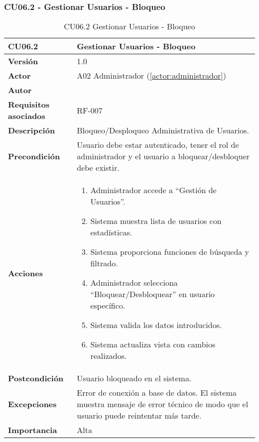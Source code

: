 \subsubsection{CU06.2 - Gestionar Usuarios - Bloqueo}

\begin{table}[H]
	\centering
	\begin{tabularx}{\linewidth}{ p{} p{} }
		\toprule
		\textbf{CU06.2}    & \textbf{Gestionar Usuarios - Bloqueo} \\
		\toprule
		\textbf{Versión}              & 1.0    \\
		\textbf{Actor}                & A02 Administrador (\ref{actor:administrador}) \\
		\textbf{Autor}                & \nombre \\
		\textbf{Requisitos asociados} & RF-007 \\
		\textbf{Descripción}          & Bloqueo/Desploqueo Administrativa de Usuarios. \\
		\textbf{Precondición}         & Usuario debe estar autenticado, tener el rol de administrador y el usuario a bloquear/desbloquer debe existir. \\
		\textbf{Acciones}             &
		\begin{enumerate}
			\def\labelenumi{\arabic{enumi}.}
			\tightlist
			\item Administrador accede a ``Gestión de Usuarios''.
            \item Sistema muestra lista de usuarios con estadísticas.
            \item Sistema proporciona funciones de búsqueda y filtrado.
            \item Administrador selecciona ``Bloquear/Desbloquear'' en usuario específico.
            \item Sistema valida los datos introducidos.
            \item Sistema actualiza vista con cambios realizados.
		\end{enumerate}\\
		\textbf{Postcondición}        & Usuario bloqueado en el sistema.\\
		\textbf{Excepciones}          & Error de conexión a base de datos. El sistema muestra mensaje de error técnico de modo que el usuario puede reintentar más tarde.\\
		\textbf{Importancia}          & Alta \\
		\bottomrule
	\end{tabularx}
	\caption{CU06.2 Gestionar Usuarios - Bloqueo}
	\label{cu:gestionar-usuarios-bloqueo}
\end{table}

